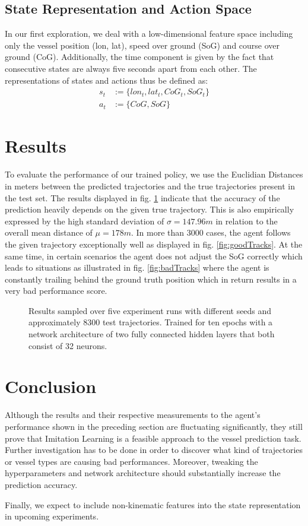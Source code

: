 \documentclass[conference]{IEEEtran}
\begin{document}
\subsection{State Representation and Action Space}
In our first exploration, we deal with a low-dimensional feature space including only the vessel position (lon, lat), speed over ground (SoG) and course over ground (CoG). Additionally, the time component is given by the fact that consecutive states are always five seconds apart from each other. The representations of states and actions thus be defined as:
\begin{equation}
    \begin{aligned}
        s_t &:= \{lon_t, lat_t, CoG_t, SoG_t\} \\
        a_t &:= \{CoG, SoG\}
    \end{aligned}
\end{equation}

\section{Results}
To evaluate the performance of our trained policy, we use the Euclidian Distances in meters between the predicted trajectories and the true trajectories present in the test set. The results displayed in fig. \ref{fig:result} indicate that the accuracy of the prediction heavily depends on the given true trajectory. This is also empirically expressed by the high standard deviation of $\sigma=147.96m$ in relation to the overall mean distance of $\mu=178m$. In more than 3000 cases, the agent follows the given trajectory exceptionally well as displayed in fig. \ref{fig:goodTracks}. At the same time, in certain scenarios the agent does not adjust the SoG correctly which leads to situations as illustrated in fig. \ref{fig:badTracks} where the agent is constantly trailing behind the ground truth position which in return results in a very bad performance score.
\begin{figure}[t]
\centering

\caption{Results sampled over five experiment runs with different seeds and approximately 8300 test trajectories. Trained for ten epochs with a network architecture of two fully connected hidden layers that both consist of 32 neurons.}
\label{fig:result}
\end{figure}
\section{Conclusion}
Although the results and their respective measurements to the agent's performance shown in the preceding section are fluctuating significantly, they still prove that Imitation Learning is a feasible approach to the vessel prediction task. Further investigation has to be done in order to discover what kind of trajectories or vessel types are causing bad performances. Moreover, tweaking the hyperparameters and network architecture should substantially increase the prediction accuracy.
\par
Finally, we expect to include non-kinematic features into the state representation in upcoming experiments.



\end{document}
